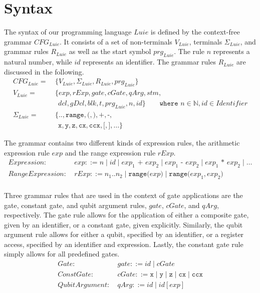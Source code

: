 \section{Syntax}
\label{sec:concept_abstractGrammar}
The syntax of our programming language $Luie$ is defined by the context-free grammar $CFG_{Luie}$. It consists of a set of non-terminals $V_{Luie}$, terminals $\Sigma_{Luie}$, and grammar rules $R_{Luie}$ as well as the start symbol $prg_{Luie}$. The rule $n$ represents a natural number, while $id$ represents an identifier. The grammar rules $R_{Luie}$ are discussed in the following.
\begin{align*}
    CFG_{Luie} = \ & \{V_{Luie}, \Sigma_{Luie}, R_{Luie}, prg_{Luie} \}\\ 
    V_{Luie} = \ & \{ exp, rExp, gate, cGate, qArg, stm,\\ 
            & \ \  dcl, gDcl, blk, t, prg_{Luie}, n, id \} \quad \quad \texttt{where } n \in \mathbb{N}, id \in Identifier\\ 
    \Sigma_{Luie} = \ & \{\texttt{..}, \texttt{range}, \texttt{(}, \texttt{)}, \texttt{+}, \texttt{-}, \\
               & \ \ \texttt{x}, \texttt{y}, \texttt{z}, \texttt{cx}, \texttt{ccx}, \texttt{[}, \texttt{]}, \dots \} 
\end{align*}

The grammar contains two different kinds of expression rules, the arithmetic expression rule $exp$ and the range expression rule $rExp$.
\begin{align*}
    Expression: \ & exp ::= n \mid id \mid exp_1 \texttt{ + } exp_2 \mid exp_1 \texttt{ - } exp_2 \mid exp_1 \texttt{ * } exp_2 \mid \dots\\
    RangeExpression: \ & rExp ::= n_1 .. n_2 \mid \texttt{range(} exp \texttt{)} \mid \texttt{range(} exp_1, exp_2 \texttt{)}\\
\end{align*}

Three grammar rules that are used in the context of gate applications are the gate, constant gate, and qubit argument rules, $gate$, $cGate$, and $qArg$, respectively. The gate rule allows for the application of either a composite gate, given by an identifier, or a constant gate, given explicitly. Similarly, the qubit argument rule allows for either a qubit, specified by an identifier, or a register access, specified by an identifier and expression. Lastly, the constant gate rule simply allows for all predefined gates. 
\begin{align*}
    Gate: \ & gate ::= id \mid cGate\\
    ConstGate: \ & cGate ::= \texttt{x} \mid \texttt{y} \mid \texttt{z} \mid \texttt{cx} \mid \texttt{ccx}\\
    QubitArgument: \ & qArg ::= id \mid id[exp]
\end{align*}

